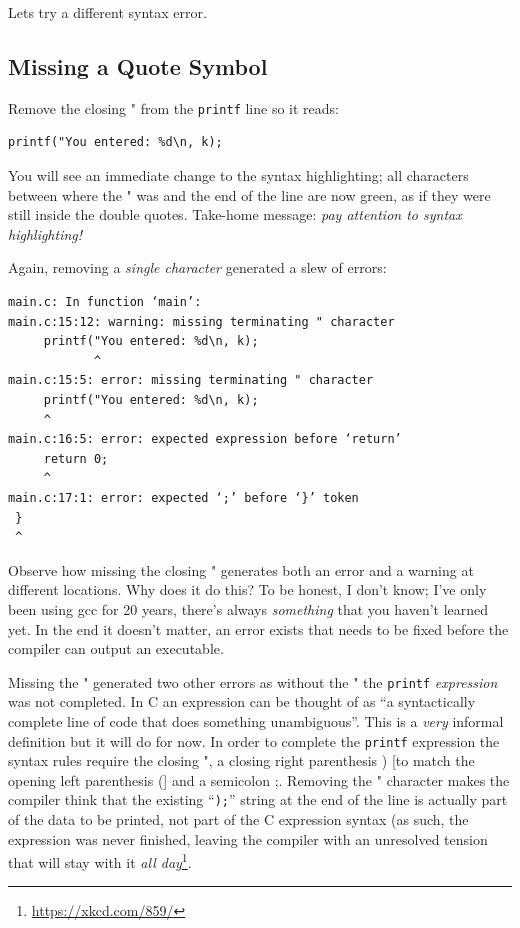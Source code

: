 \documentclass{lab}
\begin{document}
Lets try a different syntax error.

\subsection{Missing a Quote Symbol}

\begin{task}{}{} Remove the closing " from the \texttt{printf} line so it reads:

\begin{lstlisting}[style=CStyle]
printf("You entered: %d\n, k);
\end{lstlisting}

\end{task}

You will see an immediate change to the syntax highlighting; all characters between where the " was and the end of the line are now green, as if they were still inside the double quotes. Take-home message: \textit{pay attention to syntax highlighting!}

Again, removing a \textit{single character} generated a slew of errors:

\begin{lstlisting}[basicstyle=\ttfamily,caption=Errors produced by removing a \texttt{"} character.,frame=single]
main.c: In function ‘main’:
main.c:15:12: warning: missing terminating " character
     printf("You entered: %d\n, k);
            ^
main.c:15:5: error: missing terminating " character
     printf("You entered: %d\n, k);
     ^
main.c:16:5: error: expected expression before ‘return’
     return 0;
     ^
main.c:17:1: error: expected ‘;’ before ‘}’ token
 }
 ^
\end{lstlisting}

Observe how missing the closing " generates both an error and a warning at different locations. Why does it do this? To be honest, I don't know; I've only been using gcc for 20 years, there's always \textit{something} that you haven't learned yet. In the end it doesn't matter, an error exists that needs to be fixed before the compiler can output an executable.

Missing the " generated two other errors as without the " the \texttt{printf} \textit{expression} was not completed. In C an expression can be thought of as ``a syntactically complete line of code that does something unambiguous''. This is a \textit{very} informal definition but it will do for now. In order to complete the \texttt{printf} expression the syntax rules require the closing ", a closing right parenthesis ) [to match the opening left parenthesis (] and a semicolon ;. Removing the " character makes the compiler think that the existing ``\texttt{);}'' string at the end of the line is actually part of the data to be printed, not part of the C expression syntax (as such, the expression was never finished, leaving the compiler with an unresolved tension that will stay with it \textit{all day}\footnote{\url{https://xkcd.com/859/}}.
\end{document}
